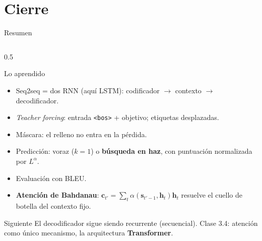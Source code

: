 \documentclass[aspectratio=169, 10pt]{beamer}
\newcommand{\tok}[1]{\texttt{#1}}
\newcommand{\bos}{\tok{<bos>}}
\begin{document}
\section{Cierre}

\begin{frame}[shrink]{Resumen}

	\begin{columns}[T]
		\begin{column}{0.5\textwidth}
			\begin{block}{Lo aprendido}
				\small
				\begin{itemize}
					\item Seq2seq = dos RNN (aqu\'i LSTM): codificador $\to$ contexto $\to$ decodificador.
					\item \emph{Teacher forcing}: entrada \bos{} + objetivo; etiquetas desplazadas.
					\item M\'ascara: el relleno no entra en la p\'erdida.
					\item Predicci\'on: voraz ($k=1$) o \textbf{b\'usqueda en haz}, con puntuaci\'on normalizada por $L^{\alpha}$.
					\item Evaluaci\'on con BLEU.
					\item \textbf{Atenci\'on de Bahdanau}: $\mathbf{c}_{t'}=\sum_t\alpha(\mathbf{s}_{t'-1},\mathbf{h}_t)\mathbf{h}_t$ resuelve el cuello de botella del contexto fijo.
				\end{itemize}
			\end{block}
			\begin{alertblock}{Siguiente}
				\small
				El decodificador sigue siendo recurrente (secuencial). Clase 3.4: atenci\'on como \'unico mecanismo, la arquitectura \textbf{Transformer}.
			\end{alertblock}
		\end{column}


\end{columns}
\end{frame}
\end{document}
